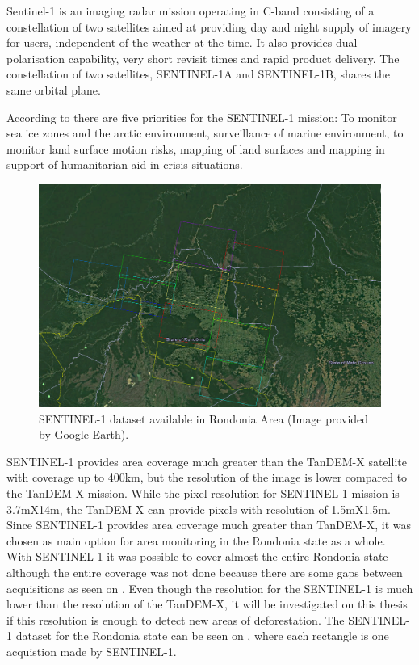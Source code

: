 Sentinel-1 is an imaging radar mission operating in C-band consisting of a constellation of two satellites aimed at providing day and night supply of imagery for users, independent of the weather at the time.
It also provides dual polarisation capability, very short revisit times and rapid product delivery. 
The constellation of two satellites, SENTINEL-1A and SENTINEL-1B, shares the same orbital plane.
\par
According to \cite{sentinelmission} there are five priorities for the SENTINEL-1 mission: To monitor sea ice zones and the arctic environment, surveillance of marine environment, to monitor land surface motion risks, mapping of land surfaces and mapping in support of humanitarian aid in crisis situations.

\begin{figure}[H]
    \centering
    \includegraphics[width=\linewidth]{Chapter2-real/sentinel_dataset.png}
    \caption{SENTINEL-1 dataset available in Rondonia Area (Image provided by Google Earth).}
    \label{fig:sentinel_dataset}
\end{figure}{}

SENTINEL-1 provides area coverage much greater than the TanDEM-X satellite with coverage up to 400km, but the resolution of the image is lower compared to the TanDEM-X mission. While the pixel resolution for SENTINEL-1 mission is 3.7mX14m, the TanDEM-X can provide pixels with resolution of 1.5mX1.5m. Since SENTINEL-1 provides area coverage much greater than TanDEM-X, it was chosen as main option for area monitoring in the Rondonia state as a whole. With SENTINEL-1 it was possible to cover almost the entire Rondonia state although the entire coverage was not done because there are some gaps between acquisitions as seen on . Even though the resolution for the SENTINEL-1 is much lower than the resolution of the TanDEM-X, it will be investigated on this thesis if this resolution is enough to detect new areas of deforestation. The SENTINEL-1 dataset for the Rondonia state can be seen on , where each rectangle is one acquistion made by SENTINEL-1.